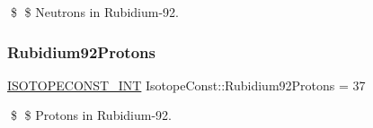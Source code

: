 \$ \$ Neutrons in Rubidium-\/92. \mbox{\label{group___isotope_const-_rubidium-_rb92_ga9c1597546d24384352d4773c0223858e}} 
\subsubsection{\texorpdfstring{Rubidium92\+Protons}{Rubidium92Protons}}
{\footnotesize\ttfamily \mbox{\hyperlink{group___isotope_const-_macros_ga5f18360b3e99483a35c32d789e62621c}{I\+S\+O\+T\+O\+P\+E\+C\+O\+N\+S\+T\+\_\+\+I\+NT}} Isotope\+Const\+::\+Rubidium92\+Protons = 37}

\$ \$ Protons in Rubidium-\/92. 